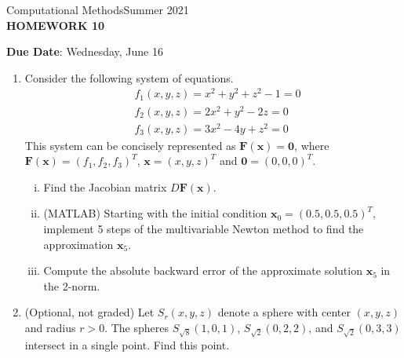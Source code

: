 \documentclass[12pt]{article}
\begin{document}
\begin{center}
Computational Methods\qquad Summer 2021
\\

\textbf{\large HOMEWORK 10}\\
\end{center}
\noindent \textbf{Due Date}: Wednesday, June 16\\

\begin{enumerate}
\item Consider the following system of equations.
	\begin{equation*}\begin{aligned}
	& f_1(x,y,z) = x^2+y^2+z^2 - 1 = 0\\
	& f_2(x,y,z) = 2x^2+y^2-2z = 0\\
	& f_3(x,y,z) = 3x^2-4y+z^2 = 0
	\end{aligned}\end{equation*}
This system can be concisely represented as $\textbf{F}(\textbf{x})=\textbf{0}$, where $\textbf{F}(\textbf{x}) = (f_1,f_2,f_3)^T$, $\textbf{x}=(x,y,z)^T$ and $\textbf{0}=(0,0,0)^T$.
	\begin{enumerate}[(i)]	
	\item Find the Jacobian matrix $D\mathbf{F}(\textbf{x})$.
	\item (MATLAB) Starting with the initial condition $\textbf{x}_0 = (0.5,0.5,0.5)^T$, implement 5 steps of the multivariable Newton method to find the approximation $\textbf{x}_{5}$.
	\item Compute the absolute backward error of the approximate solution $\textbf{x}_{5}$ in the 2-norm.
	\end{enumerate}
\item (Optional, not graded) Let $S_r(x,y,z)$ denote a sphere with center $(x,y,z)$ and radius $r>0$. The spheres $S_{\sqrt{8}}(1,0,1)$, $S_{\sqrt{2}}(0,2,2)$, and $S_{\sqrt{2}}(0,3,3)$ intersect in a single point. Find this point. 
\end{enumerate}
\end{document}

